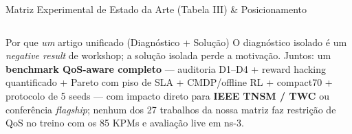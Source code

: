 \documentclass[aspectratio=169,10pt,xcolor={dvipsnames,table}]{beamer}
\begin{document}
\begin{frame}{Matriz Experimental de Estado da Arte (Tabela III) \& Posicionamento}
\begin{table}
\begin{tabular}{@{}llcccc@{}}
    \end{tabular}
  \end{table}
  \vspace{-1mm}
  \begin{block}{Por que \emph{um} artigo unificado (Diagnóstico + Solução)}
    \small O diagnóstico isolado é um \emph{negative result} de workshop; a
    solução isolada perde a motivação. Juntos: um \textbf{benchmark QoS-aware
    completo} --- auditoria D1--D4 + reward hacking quantificado + Pareto com
    piso de SLA + CMDP/offline RL + compact70 + protocolo de 5 seeds ---
    com impacto direto para \textbf{IEEE TNSM / TWC} ou conferência
    \emph{flagship}; nenhum dos 27 trabalhos da nossa matriz faz restrição de
    QoS no treino com os 85 KPMs e avaliação live em ns-3.
  \end{block}
\end{frame}
\end{document}
